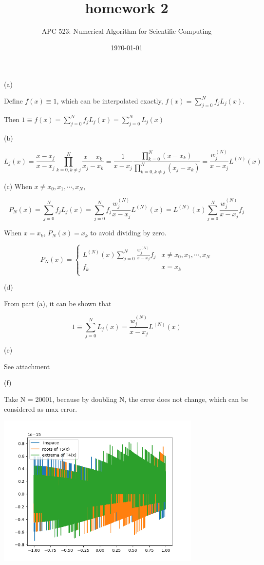 \documentclass[10pt]{article}
\title{homework 2}
\date{\today}
\author{APC 523: Numerical Algorithm for Scientific Computing}
\begin{document}
\maketitle

\section{}

(a)

Define $f(x)\equiv 1$, which can be interpolated exactly, $f(x)=\sum_{j=0}^{N}f_jL_j(x)$.

Then $1\equiv f(x)=\sum_{j=0}^{N}f_jL_j(x)=\sum_{j=0}^{N}L_j(x)$


(b)

$$
L_j(x)=\frac{x-x_j}{x-x_j}\prod_{k=0,k\neq j}^N\frac{x-x_k}{x_j-x_k}=\frac{1}{x-x_j}\frac{\prod_{k=0}^N(x-x_k)}{\prod_{k=0,k\neq j}^N(x_j-x_k)}=\frac{w_j^{(N)}}{x-x_j}L^{(N)}(x)
$$

(c)
When $x\neq x_0,x_1,\cdots, x_N$,

$$
P_N(x)=\sum_{j=0}^{N}f_jL_j(x)=\sum_{j=0}^{N}f_j\frac{w_j^{(N)}}{x-x_j}L^{(N)}(x)=L^{(N)}(x)\sum_{j=0}^{N}\frac{w_j^{(N)}}{x-x_j}f_j
$$

When $x=x_k$, $P_N(x)=x_k$ to avoid dividing by zero.

\[  P_N(x)= \left\{
\begin{array}{ll}
L^{(N)}(x)\sum_{j=0}^{N}\frac{w_j^{(N)}}{x-x_j}f_j & x\neq x_0,x_1,\cdots, x_N\\
f_k & x=x_k\\
\end{array} 
\right. \]


(d)

From part (a), it can be shown that 

$$
1\equiv \sum_{j=0}^{N}L_j(x) = \frac{w_j^{(N)}}{x-x_j}L^{(N)}(x)
$$

(e)

See attachment

(f)

Take N = 20001, because by doubling N, the error does not change, which can be considered as max error.

\includegraphics[width=4in]{p1f.png}
\end{document}
